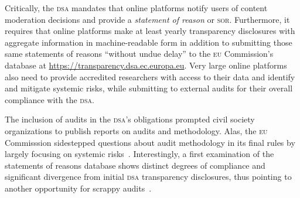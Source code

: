\documentclass[nonacm,screen]{acmart}
\newcommand\V[1]{\textsc{\MakeLowercase{#1}}}
\begin{document}
Critically, the \V{DSA} mandates that online platforms notify users of content
moderation decisions and provide a \emph{statement of reason} or \V{SoR}.
Furthermore, it requires that online platforms make at least yearly transparency
disclosures with aggregate information in machine-readable form in addition to
submitting those same statements of reasons ``without undue delay'' to the
\V{EU} Commission's database at \url{https://transparency.dsa.ec.europa.eu}.
Very large online platforms also need to provide accredited researchers with
access to their data and identify and mitigate systemic risks, while submitting
to external audits for their overall compliance with the \V{DSA}.

The inclusion of audits in the \V{DSA}'s obligations prompted civil society
organizations to publish reports on audits and methodology. Alas, the \V{EU}
Commisssion sidestepped questions about audit methodology in its final rules by
largely focusing on systemic risks~\cite{EuropeanCommission2023}. Interestingly,
a first examination of the statements of reasons database shows distinct degrees
of compliance and significant divergence from initial \V{DSA} transparency
disclosures, thus pointing to another opportunity for scrappy
audits~\cite{TrujilloFagniea2024}.
\end{document}
